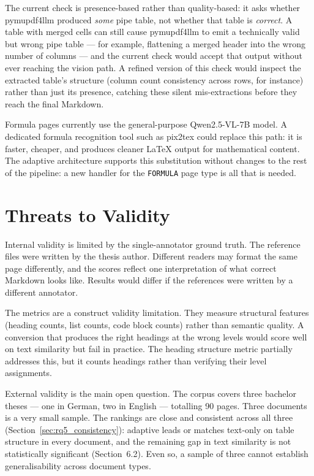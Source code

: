 The current check is presence-based rather than quality-based: it asks whether pymupdf4llm produced \emph{some} pipe table, not whether that table is \emph{correct}.
A table with merged cells can still cause pymupdf4llm to emit a technically valid but wrong pipe table --- for example, flattening a merged header into the wrong number of columns --- and the current check would accept that output without ever reaching the vision path.
A refined version of this check would inspect the extracted table's structure (column count consistency across rows, for instance) rather than just its presence, catching these silent mis-extractions before they reach the final Markdown.

Formula pages currently use the general-purpose Qwen2.5-VL-7B model.
A dedicated formula recognition tool such as pix2tex could replace
this path: it is faster, cheaper, and produces cleaner LaTeX output
for mathematical content. The adaptive
architecture supports this substitution without changes to the rest of
the pipeline: a new handler for the \texttt{FORMULA} page type is
all that is needed.

\section{Threats to Validity}
\label{sec:threats_to_validity}

Internal validity is limited by the single-annotator ground truth. The
reference files were written by the thesis author. Different readers may
format the same page differently, and the scores reflect one interpretation
of what correct Markdown looks like. Results would differ if the references
were written by a different annotator.

The metrics are a construct validity limitation. They measure structural
features (heading counts, list counts, code block counts) rather than
semantic quality. A conversion that produces the right headings at the wrong
levels would score well on text similarity but fail in practice. The heading
structure metric partially addresses this, but it counts headings rather than
verifying their level assignments.

External validity is the main open question. The corpus covers three bachelor theses --- one in German, two in English --- totalling 90 pages. Three documents is a very small sample. The rankings are close and consistent across all three (Section~\ref{sec:rq5_consistency}): adaptive leads or matches text-only on table structure in every document, and the remaining gap in text similarity is not statistically significant (Section~6.2). Even so, a sample of three cannot establish generalisability across document types.

